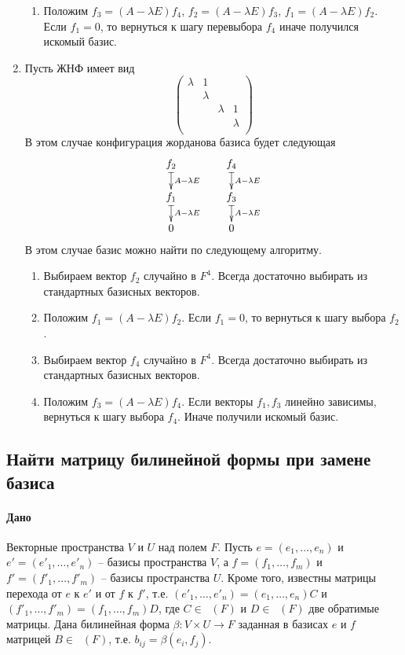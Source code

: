 \documentclass{article}
\newcommand{\MatrixDim}[3]{\mathop{\mathrm{M}_{#2\,#3}}(#1)}
\newcommand{\Matrix}[2]{\mathop{\mathrm{M}_{#2}}(#1)}
\begin{document}
\begin{enumerate}
\begin{enumerate}
\item Положим $f_3 = (A - \lambda E) f_4$, $f_2 = (A - \lambda E) f_3$, $f_1 = (A - \lambda E) f_2$. Если $f_1 = 0$, то вернуться к шагу перевыбора $f_4$ иначе получился искомый базис.
\end{enumerate}

\item Пусть ЖНФ имеет вид
\[
\begin{pmatrix}
{\lambda}&{1}&{}&{}\\
{}&{\lambda}&{}&{}\\
{}&{}&{\lambda}&{1}\\
{}&{}&{}&{\lambda}\\
\end{pmatrix}
\]
В этом случае конфигурация жорданова базиса будет следующая
\[
\xymatrix@R=15pt@C=40pt{
  {f_2}\ar@{|->}[d]^{A-\lambda E}&{f_4}\ar@{|->}[d]^{A-\lambda E}\\
  {f_1}\ar@{|->}[d]^{A-\lambda E}&{f_3}\ar@{|->}[d]^{A-\lambda E}\\
  {0}&{0}
}
\]
В этом случае базис можно найти по следующему алгоритму.
\begin{enumerate}
\item Выбираем вектор $f_2$ случайно в $F^4$. Всегда достаточно выбирать из стандартных базисных векторов.

\item Положим $f_1 = (A - \lambda E) f_2$. Если $f_1 = 0$, то вернуться к шагу выбора $f_2$.

\item Выбираем вектор $f_4$ случайно в $F^4$. Всегда достаточно выбирать из стандартных базисных векторов.

\item Положим $f_3 = (A - \lambda E) f_4$. Если векторы $f_1,  f_3$ линейно зависимы, вернуться к шагу выбора $f_4$. Иначе получили искомый базис.

\end{enumerate}
\end{enumerate}


\subsection{Найти матрицу билинейной формы при замене базиса}

\paragraph{Дано}
Векторные пространства $V$ и $U$ над полем $F$. Пусть $e=(e_1,\ldots,e_n)$ и $e'=(e'_1,\ldots,e'_n)$ -- базисы пространства $V$, а $f = (f_1,\ldots,f_m)$ и $f' = (f'_1,\ldots,f'_m)$ -- базисы пространства $U$. Кроме того, известны матрицы перехода от $e$ к $e'$ и от $f$ к $f'$, т.е. $(e'_1,\ldots,e'_n) = (e_1,\ldots,e_n)C$ и $(f'_1,\ldots,f'_m) = (f_1,\ldots,f_m)D$, где $C\in \Matrix{F}{n}$ и $D\in \Matrix{F}{m}$ две обратимые матрицы. Дана билинейная форма $\beta\colon V\times U\to F$ заданная в базисах $e$ и $f$ матрицей $B\in\MatrixDim{F}{n}{m}$, т.е. $b_{ij} = \beta(e_i, f_j)$.
\end{document}

